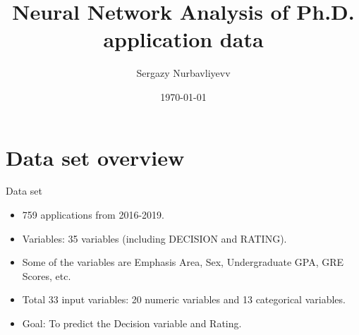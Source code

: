 \documentclass[11pt]{beamer}
\begin{document}
	\beamertemplatenavigationsymbolsempty
\author[Sergazy Nurbavliyev]{Sergazy Nurbavliyevv}
\title[Neural Network Analysis of Ph.D. application data \hspace{2em}\insertframenumber/\inserttotalframenumber]{Neural Network Analysis of Ph.D. application data}
\date{\today} %

	\begin{frame}[plain]
	\maketitle
	\tableofcontents
\end{frame}


\section{Data set overview}
\begin{frame}{Data set }
	\begin{itemize}
		\item 759 applications from 2016-2019.
		\pause
		\item  	Variables: 35 variables (including DECISION and RATING).
		
		\pause
		\item Some of the variables are Emphasis Area, Sex, Undergraduate GPA, GRE Scores, etc.
		\pause
		\item Total 33 input variables: 20 numeric variables and 13 categorical variables.
		\pause
		
	\item Goal: To predict the Decision variable and Rating.
	\end{itemize}
\end{frame}
\end{document}
